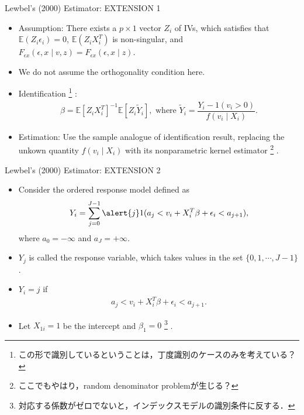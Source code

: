 \documentclass[xcolor=svgnames,dvipdfmx,cjk]{beamer}
\theoremstyle{example}
\def\E{\mathbb{E}}
\begin{document}
\begin{frame}{Lewbel's (2000) Estimator: \alert{EXTENSION 1}}
  \begin{itemize}
    \item \alert{Assumption}: 
          There exists a $p \times 1$ vector $Z_i$ of IVs,
          which satisfies that 
          $\E(Z_i\epsilon_i)=0$, 
          $\E(Z_iX_i^T)$ is non-singular, and
          $F_{\epsilon x}(\epsilon,x \mid v,z) = F_{\epsilon x}(\epsilon,x \mid z)$. 
    \item We do not assume the orthogonality condition here.
    \item \alert{Identification}
          \footnote{この形で識別しているということは，丁度識別のケースのみを考えている？}
          :
          \begin{align*}
            \beta = \E[Z_i X_i^T]^{-1} \E[Z_i \tilde{Y}_i], 
            \text{ where } \tilde{Y}_i = \dfrac{Y_i - 1(v_i > 0)}{f(v_i \mid X_i)}. 
          \end{align*}
    \item \alert{Estimation}: 
          Use the sample analogue of identification result, 
          replacing the unkown quantity $f(v_i \mid X_i)$ 
          with its nonparametric kernel estimator
          \footnote{ここでもやはり，random denominator problemが生じる？}
          .
  \end{itemize}
\end{frame}  
  
\begin{frame}{Lewbel's (2000) Estimator: \alert{EXTENSION 2}}
\begin{itemize}
  \item Consider \alert{the ordered response model} defined as
        \begin{align*}
          Y_i = \sum_{j=0}^{J-1} \alert{j}
                1(a_j < v_i + X_i^T \beta + \epsilon_i < a_{j+1}),
        \end{align*}
        where $a_0 = - \infty$ and $a_J = + \infty$.
  \item $Y_j$ is called \alert{the response variable}, 
        which takes values in the set $\{0, 1, \cdots, J-1\}$.
  \item $Y_i = j$ if 
        \begin{align*}
          a_j < v_i + X_i^T \beta + \epsilon_i < a_{j+1}.
        \end{align*}
  \item Let $X_{1i} = 1$ be the intercept and $\beta_1 = 0$
        \footnote{対応する係数がゼロでないと，インデックスモデルの識別条件に反する．}
        .
\end{itemize}
\end{frame}
\end{document}
